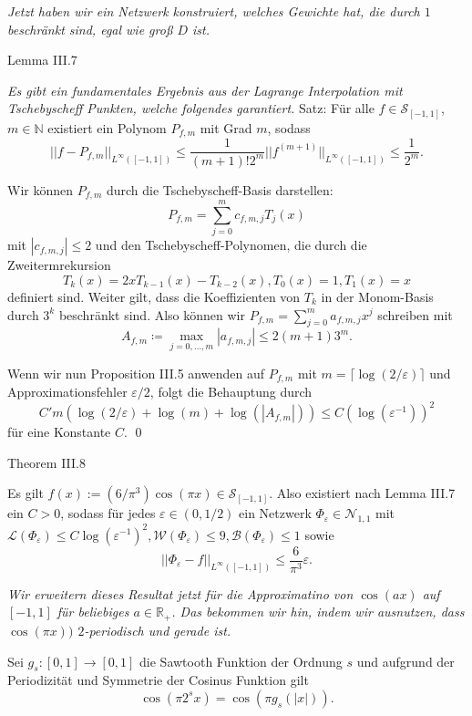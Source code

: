 \documentclass[12pt]{article}
\newcommand{\N}{\mathbb{N}} %
\newcommand{\R}{\mathbb{R}} %
\begin{document}
\textit{Jetzt haben wir ein Netzwerk konstruiert, welches Gewichte hat, die durch \(1\) 
beschränkt sind, egal wie groß \(D\) ist.}

\newpage

{\Large Lemma III.7}

\textit{Es gibt ein fundamentales Ergebnis aus der Lagrange Interpolation mit 
Tschebyscheff Punkten, welche folgendes garantiert.}
Satz: 
Für alle \(f\in \mathcal{S}_{[-1,1]}\), \(m\in\N\) existiert ein Polynom 
\(P_{f,m}\) mit Grad \(m\), sodass 
\[ ||f - P_{f,m}||_{L^\infty ([-1,1])} \leq \frac{1}{(m+1)!2^m} ||f^{(m+1)}||_{L^\infty ([-1,1])} \leq \frac{1}{2^m}. \]

Wir können \(P_{f,m}\) durch die Tschebyscheff-Basis darstellen: 
\[ P_{f,m} = \sum_{j=0}^m c_{f,m,j} T_j(x) \]
mit \(|c_{f,m,j}| \leq 2\) 
und den Tschebyscheff-Polynomen, die durch die Zweitermrekursion 
\[ T_k(x) = 2x T_{k-1}(x) - T_{k-2}(x), T_0(x) = 1, T_1(x) = x \]
definiert sind.
Weiter gilt, dass die Koeffizienten von \(T_k\) in der Monom-Basis 
durch \(3^k\) beschränkt sind. 
Also können wir \(P_{f,m} = \sum_{j=0}^m a_{f,m,j} x^j\) schreiben mit 
\[ A_{f,m} \coloneqq \max_{j=0,\ldots, m} |a_{f,m,j}| \leq 2(m+1)3^m. \] 

Wenn wir nun Proposition III.5 anwenden auf \(P_{f,m}\) mit \(m= \lceil \log(2/\varepsilon)\rceil\) 
und Approximationsfehler \(\varepsilon/2\), folgt die Behauptung durch
\[ C' m(\log(2/\varepsilon) + \log(m) + \log(|A_{f,m}|)) \leq C (\log(\varepsilon^{-1}))^2 \]
für eine Konstante \(C\). \qed

\newpage

{\Large Theorem III.8}

Es gilt \(f(x) := (6/\pi^3) \cos(\pi x) \in \mathcal{S}_{[-1,1]}\). Also existiert nach Lemma III.7 
ein \(C>0\), sodass für jedes \(\varepsilon \in (0,1/2)\) ein Netzwerk \(\Phi_\varepsilon \in \mathcal{N}_{1,1}\) 
mit \(\mathcal{L}(\Phi_\varepsilon) \leq C \log(\varepsilon^{-1})^2, \mathcal{W}(\Phi_\varepsilon) \leq 9, 
\mathcal{B}(\Phi_\varepsilon) \leq 1\) sowie 
\[ ||\Phi_\varepsilon - f ||_{L^{\infty}([-1,1])} \leq \frac{6}{\pi^3} \varepsilon. \tag{\(*\)} \]

\textit{Wir erweitern dieses Resultat jetzt für die Approximatino von \(\cos(ax)\) auf \([-1,1]\) für beliebiges \(a\in \R_+\). 
Das bekommen wir hin, indem wir ausnutzen, dass \(\cos(\pi x))\) \(2\)-periodisch und gerade ist.}

Sei \(g_s:[0,1] \rightarrow [0,1]\) die Sawtooth Funktion der Ordnung \(s\) und aufgrund der Periodizität und Symmetrie der Cosinus Funktion gilt 
\[ \cos(\pi 2^s x) = \cos(\pi g_s(|x|)). \]
\end{document}
